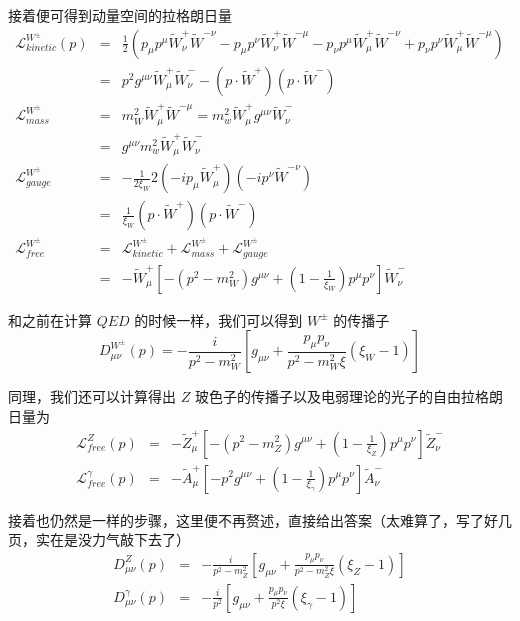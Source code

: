 \documentclass{article}
\begin{document}
接着便可得到动量空间的拉格朗日量
\begin{eqnarray*}
    \mathcal{L}_{kinetic}^{W^\pm}(p) &=& \frac{1}{2} \left(p_\mu p^\mu \tilde{W}_\nu^+ \tilde{W}^{-\nu} - p_\mu p^\nu \tilde{W}_\nu^+ \tilde{W}^{-\mu} - p_\nu p^\mu \tilde{W}_\mu^+ \tilde{W}^{-\nu} + p_\nu p^\nu \tilde{W}_\mu^+ \tilde{W}^{-\mu}\right) \\
    &=& p^2 g^{\mu\nu} \tilde{W}_\mu^+ \tilde{W}_{\nu}^{-} - \left(p \cdot \tilde{W}^+\right)\left(p \cdot \tilde{W}^-\right) \\
    \mathcal{L}_{mass}^{W^{\pm}} &=& m_W^2 \tilde{W}_\mu^+ \tilde{W}^{-\mu} = m_w^2 \tilde{W}_\mu^+ g^{\mu\nu} \tilde{W}_{\nu}^{-} \\
    &=& g^{\mu\nu} m_w^2 \tilde{W}_\mu^+ \tilde{W}_{\nu}^{-} \\
    \mathcal{L}_{gauge}^{W^{\pm}} &=& -\frac{1}{2\xi_W} 2\left(-ip_\mu\tilde{W}_\mu^+\right)\left(-ip^\nu \tilde{W}^{-\nu}\right)\\
    &=& \frac{1}{\xi_W} \left(p \cdot \tilde{W}^+\right)\left(p \cdot \tilde{W}^-\right) \\
    \mathcal{L}_{free}^{W^\pm} &=& \mathcal{L}_{kinetic}^{W^\pm} + \mathcal{L}_{mass}^{W^{\pm}} + \mathcal{L}_{gauge}^{W^{\pm}} \\
    &=& -\tilde{W}_\mu^+ \left[-\left(p^2 - m_W^2\right)g^{\mu\nu} + \left(1 - \frac{1}{\xi_W}\right)p^\mu p^\nu\right] \tilde{W}_{\nu}^{-}
\end{eqnarray*}

和之前在计算 $QED$ 的时候一样，我们可以得到 $W^{\pm}$ 的传播子
\begin{equation}
    D_{\mu\nu}^{W^\pm}(p) = -\frac{i}{p^2 - m_W^2}\left[g_{\mu\nu} + \frac{p_\mu p_\nu}{p^2 - m_W^2 \xi}\left(\xi_W - 1\right)\right]
\end{equation}



同理，我们还可以计算得出 $Z$ 玻色子的传播子以及电弱理论的光子的自由拉格朗日量为
\begin{eqnarray}
    \mathcal{L}_{free}^{Z}(p) &=& -\tilde{Z}_\mu^+ \left[-\left(p^2 - m_Z^2\right)g^{\mu\nu} + \left(1 - \frac{1}{\xi_Z}\right)p^\mu p^\nu\right] \tilde{Z}_{\nu}^{-} \\
    \mathcal{L}_{free}^{\gamma}(p) &=& -\tilde{A}_\mu^+ \left[-p^2 g^{\mu\nu} + \left(1 - \frac{1}{\xi_\gamma}\right)p^\mu p^\nu\right] \tilde{A}_{\nu}^{-}
\end{eqnarray}

接着也仍然是一样的步骤，这里便不再赘述，直接给出答案（太难算了，写了好几页，实在是没力气敲下去了）
\begin{eqnarray}
    D_{\mu\nu}^{Z}(p) &=& -\frac{i}{p^2 - m_Z^2}\left[g_{\mu\nu} + \frac{p_\mu p_\nu}{p^2 - m_Z^2 \xi}\left(\xi_Z - 1\right)\right] \\
    D_{\mu\nu}^{\gamma}(p) &=& -\frac{i}{p^2}\left[g_{\mu\nu} + \frac{p_\mu p_\nu}{p^2 \xi}\left(\xi_\gamma - 1\right)\right]
\end{eqnarray}
\end{document}
